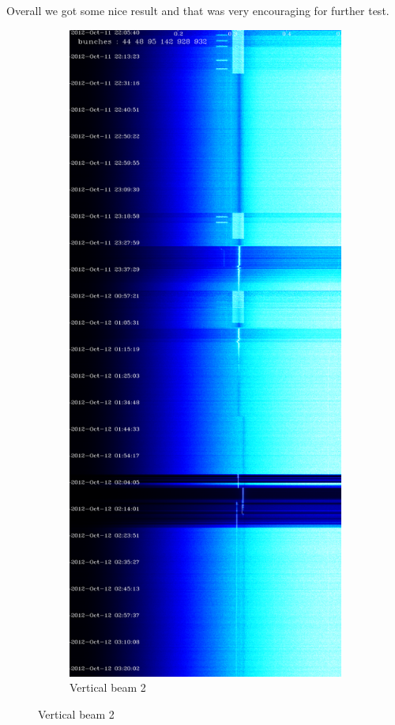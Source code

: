 Overall we got some nice result and that was very encouraging for further test.

\begin{figure}[H]
\centering
\begin{subfigure}{.5\textwidth}
  \centering
  \includegraphics[width=.8\linewidth]{md-121011-vb2-bunches111111-16.png}
  \caption{Vertical beam 2}

\end{subfigure}
\end{figure}
